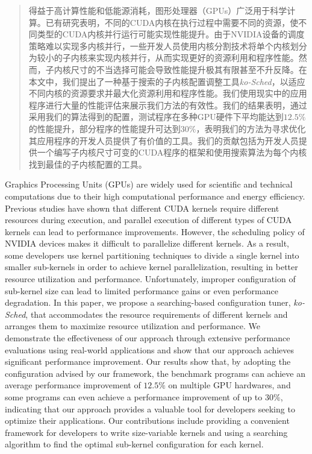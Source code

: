 

\begin{abstract}
  得益于高计算性能和低能源消耗，图形处理器（GPUs）广泛用于科学计算。已有研究表明，不同的CUDA内核在执行过程中需要不同的资源，使不同类型的CUDA内核并行运行可能实现性能提升。由于NVIDIA设备的调度策略难以实现多内核并行，一些开发人员使用内核分割技术将单个内核划分为较小的子内核来实现内核并行，从而实现更好的资源利用和程序性能。然而，子内核尺寸的不当选择可能会导致性能提升极其有限甚至不升反降。在本文中，我们提出了一种基于搜索的子内核配置调整工具\emph{ko-Sched}，以适应不同内核的资源要求并最大化资源利用和程序性能。我们使用现实中的应用程序进行大量的性能评估来展示我们方法的有效性。我们的结果表明，通过采用我们的算法得到的配置，测试程序在多种GPU硬件下平均能达到$12.5\%$的性能提升，部分程序的性能提升可达到$30\%$，表明我们的方法为寻求优化其应用程序的开发人员提供了有价值的工具。我们的贡献包括为开发人员提供一个编写子内核尺寸可变的CUDA程序的框架和使用搜索算法为每个内核找到最佳的子内核配置的工具。
\end{abstract}

\begin{abstract*}
  Graphics Processing Units (GPUs) are widely used for scientific and technical computations due to their high computational performance and energy efficiency. Previous studies have shown that different CUDA kernels require different resources during execution, and parallel execution of different types of CUDA kernels can lead to performance improvements. However, the scheduling policy of NVIDIA devices makes it difficult to parallelize different kernels. As a result, some developers use kernel partitioning techniques to divide a single kernel into smaller sub-kernels in order to achieve kernel parallelization, resulting in better resource utilization and performance. Unfortunately, improper configuration of sub-kernel size can lead to limited performance gains or even performance degradation. In this paper, we propose a searching-based configuration tuner, \emph{ko-Sched}, that accommodates the resource requirements of different kernels and arranges them to maximize resource utilization and performance. We demonstrate the effectiveness of our approach through extensive performance evaluations using real-world applications and show that our approach achieves significant performance improvement. Our results show that, by adopting the configuration advised by our framework, the benchmark programs can achieve an average performance improvement of $12.5\%$ on multiple GPU hardwares, and some programs can even achieve a performance improvement of up to $30\%$, indicating that our approach provides a valuable tool for developers seeking to optimize their applications. Our contributions include providing a convenient framework for developers to write size-variable kernels and using a searching algorithm to find the optimal sub-kernel configuration for each kernel. 
\end{abstract*}
